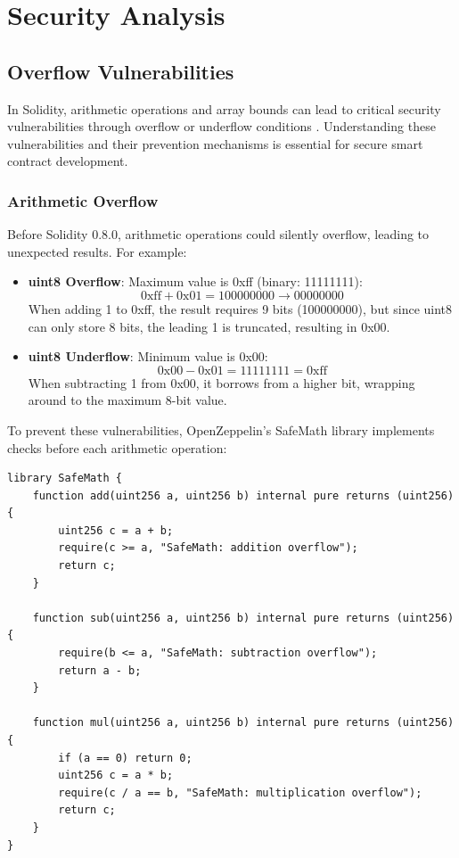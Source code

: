 \documentclass[conference]{IEEEtran}
\begin{document}
\section{Security Analysis}

\subsection{Overflow Vulnerabilities}
In Solidity, arithmetic operations and array bounds can lead to critical security vulnerabilities through overflow or underflow conditions \cite{overflowVuln}. Understanding these vulnerabilities and their prevention mechanisms is essential for secure smart contract development.

\subsubsection{Arithmetic Overflow}
Before Solidity 0.8.0, arithmetic operations could silently overflow, leading to unexpected results. For example:

\begin{itemize}
    \item \textbf{uint8 Overflow}: Maximum value is 0xff (binary: 11111111):
    \[ \text{0xff} + \text{0x01} = \text{1}\text{00000000} \rightarrow \text{00000000} \]
    When adding 1 to 0xff, the result requires 9 bits (100000000), but since uint8 can only store 8 bits, the leading 1 is truncated, resulting in 0x00.
    
    \item \textbf{uint8 Underflow}: Minimum value is 0x00:
    \[ \text{0x00} - \text{0x01} = \text{11111111} = \text{0xff} \]
    When subtracting 1 from 0x00, it borrows from a higher bit, wrapping around to the maximum 8-bit value.
\end{itemize}

To prevent these vulnerabilities, OpenZeppelin's SafeMath library implements checks before each arithmetic operation:

\begin{lstlisting}[style=solidity]
library SafeMath {
    function add(uint256 a, uint256 b) internal pure returns (uint256) {
        uint256 c = a + b;
        require(c >= a, "SafeMath: addition overflow");
        return c;
    }

    function sub(uint256 a, uint256 b) internal pure returns (uint256) {
        require(b <= a, "SafeMath: subtraction overflow");
        return a - b;
    }

    function mul(uint256 a, uint256 b) internal pure returns (uint256) {
        if (a == 0) return 0;
        uint256 c = a * b;
        require(c / a == b, "SafeMath: multiplication overflow");
        return c;
    }
}
\end{lstlisting}
\end{document}
